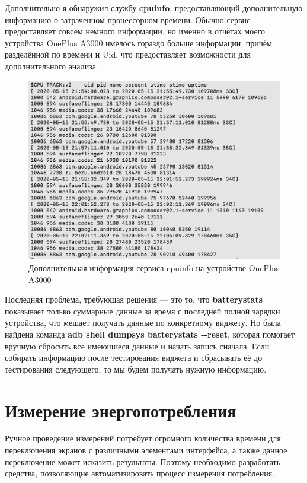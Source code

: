 \documentclass[a4paper,14pt]{extarticle} %
\begin{document}
	Дополнительно я обнаружил службу \textbf{cpuinfo}, предоставляющий дополнительную информацию о затраченном процессорном времени. Обычно сервис предоставляет совсем немного информации, но именно в отчётах моего устройства OnePlus A3000 имелось гораздо больше информации, причём разделённой по времени и Uid, что предоставляет возможности для дополнительного анализа~\ris{\ref{fig:cpuinfo}}.
	
	\begin{figure}[H]
		\includegraphics[width=\textwidth]{cpuinfo}
		\caption{Дополнительная информация сервиса cpuinfo на устройстве OnePlus A3000}
		\label{fig:cpuinfo}
	\end{figure}

	Последняя проблема, требующая решения --- это то, что \textbf{batterystats} показывает только суммарные данные за время с последней полной зарядки устройства, что мешает получать данные по конкретному виджету. Но была найдена команда \textbf{adb shell dumpsys batterystats -{}-reset}, которая помогает вручную сбросить все имеющиеся данные и начать запись сначала. Если собирать информацию после тестирования виджета и сбрасывать её до тестирования следующего, то мы будем получать нужную информацию.
	
	\newpage
	\section{Измерение энергопотребления}
	
	Ручное проведение измерений потребует огромного количества времени для переключения экранов с различными элементами интерфейса, а также данное переключение может исказить результаты. Поэтому необходимо разработать средства, позволяющие автоматизировать процесс измерения потребления.
	
\end{document}
